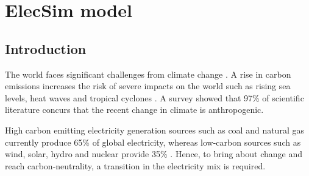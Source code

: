 \chapter{ElecSim model}

\ifpdf
    \graphicspath{{Chapter3/Figs/Raster/}{Chapter3/Figs/PDF/}{Chapter3/Figs/}}
\else
    \graphicspath{{Chapter3/Figs/Vector/}{Chapter3/Figs/}}
\fi

\section{Introduction}


The world faces significant challenges from climate change \cite{Masson-Delmotte2018}. A rise in carbon emissions increases the risk of severe impacts on the world such as rising sea levels, heat waves and tropical cyclones \cite{Masson-Delmotte2018}. A survey \cite{Cook2013} showed that 97\% of scientific literature concurs that the recent change in climate is anthropogenic.

High carbon emitting electricity generation sources such as coal and natural gas currently produce 65\% of global electricity, whereas low-carbon sources such as wind, solar, hydro and nuclear provide 35\% \cite{BP2018}. Hence, to bring about change and reach carbon-neutrality, a transition in the electricity mix is required.









